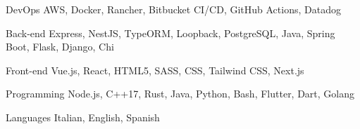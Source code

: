 
\begin{cvskills}

	\cvskill
	{DevOps} %
	{AWS, Docker, Rancher, Bitbucket CI/CD, GitHub Actions, Datadog} %

	\cvskill
	{Back-end} %
	{Express, NestJS, TypeORM, Loopback, PostgreSQL, Java, Spring Boot, Flask, Django, Chi} %

	\cvskill
	{Front-end} %
	{Vue.js, React, HTML5, SASS, CSS, Tailwind CSS, Next.js} %

	\cvskill
	{Programming} %
	{Node.js, C++17, Rust, Java, Python, Bash, Flutter, Dart, Golang} %

	\cvskill
	{Languages} %
	{Italian, English, Spanish} %

\end{cvskills}
